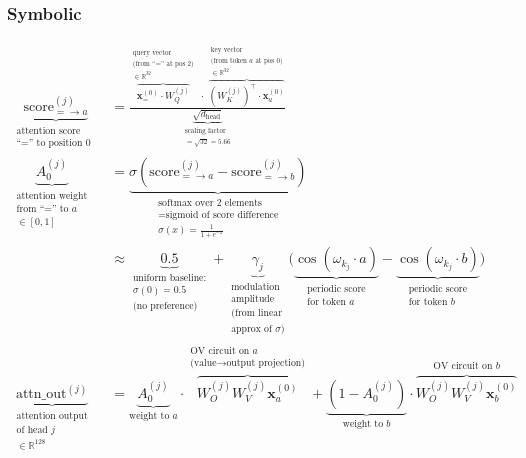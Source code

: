 \documentclass[11pt,a4paper]{article}
\begin{document}
\subsubsection*{Symbolic}
\begin{align}
    \underbrace{\text{score}^{(j)}_{= \to a}}_{\substack{\text{attention score from} \\ \text{``='' to position 0}}} &= \frac{\overbrace{\mathbf{x}^{(0)}_= \cdot W_Q^{(j)}}^{\substack{\text{query vector} \\ \text{(from ``='' at pos 2)} \\ \in \mathbb{R}^{32}}}\;\cdot\; \overbrace{\left(W_K^{(j)}\right)^\top \!\cdot \mathbf{x}^{(0)}_a}^{\substack{\text{key vector} \\ \text{(from token } a \text{ at pos 0)} \\ \in \mathbb{R}^{32}}}}{\underbrace{\sqrt{d_{\text{head}}}}_{\substack{\text{scaling factor} \\ = \sqrt{32} = 5.66}}} \\
    \underbrace{A^{(j)}_0}_{\substack{\text{attention weight} \\ \text{from ``='' to } a \\ \in [0, 1]}} &= \underbrace{\sigma\!\left(\text{score}^{(j)}_{= \to a} - \text{score}^{(j)}_{= \to b}\right)}_{\substack{\text{softmax over 2 elements} \\ = \text{sigmoid of score difference} \\ \sigma(x) = \frac{1}{1 + e^{-x}}}} \\
    &\approx \underbrace{0.5}_{\substack{\text{uniform baseline:} \\ \sigma(0) = 0.5 \\ \text{(no preference)}}} + \underbrace{\gamma_j}_{\substack{\text{modulation} \\ \text{amplitude} \\ \text{(from linear} \\ \text{approx of } \sigma\text{)}}} \Big(\underbrace{\cos\!\left(\omega_{k_j} \cdot a\right)}_{\substack{\text{periodic score} \\ \text{for token } a}} - \underbrace{\cos\!\left(\omega_{k_j} \cdot b\right)}_{\substack{\text{periodic score} \\ \text{for token } b}}\Big) \\
    \underbrace{\text{attn\_out}^{(j)}}_{\substack{\text{attention output} \\ \text{of head } j \\ \in \mathbb{R}^{128}}} &= \underbrace{A^{(j)}_0}_{\text{weight to } a} \cdot \overbrace{W_O^{(j)} W_V^{(j)} \mathbf{x}^{(0)}_a}^{\substack{\text{OV circuit on } a \\ \text{(value} \to \text{output projection)}}} + \underbrace{(1 - A^{(j)}_0)}_{\text{weight to } b} \cdot \overbrace{W_O^{(j)} W_V^{(j)} \mathbf{x}^{(0)}_b}^{\substack{\text{OV circuit on } b}}
\end{align}
\end{document}

